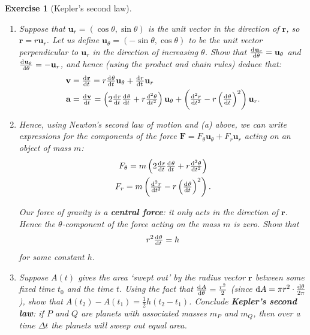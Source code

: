 \documentclass[a4paper,leqno,10pt]{article}
\theoremstyle{exercise}
\newtheorem{Exercise}{Exercise}
\newenvironment{exercise}
  {\begin{mdframed}\begin{Exercise}}
  {\end{Exercise}\end{mdframed}}
\theoremstyle{plain}
\theoremstyle{definition}
\theoremstyle{remark}
\newcommand{\df}{\textbf}
\renewcommand\vec{\mathbf}
\begin{document}
\begin{exercise}[Kepler's second law]
  \begin{enumerate}
    \item Suppose that $ \vec{u}_r = (\cos \theta, \sin \theta) $ is the unit vector in the direction of $ \vec{r} $, so $ \vec{r} = r\vec{u}_r $.
          Let us define $ \vec{u}_\theta = (-\sin\theta, \cos \theta) $ to be the unit vector perpendicular to $ \vec{u}_r $ in the direction
          of increasing $ \theta $. Show that $ \od{\vec{u}_r}{\theta} = \vec{u}_\theta $ and $ \od{\vec{u}_\theta}{\theta} = -\vec{u}_r $, and hence (using
          the product and chain rules) deduce that:
          \begin{align*}
            \vec{v} &= \od{\vec{r}}{t} = r \od{\theta}{t} \vec{u}_\theta + \od{r}{t} \vec{u}_r\\
            \vec{a} &= \od{\vec{v}}{t} = \left( 2\od{r}{t} \od{\theta}{t} + r \od[2]{\theta}{t} \right) \vec{u}_\theta
                                      + \left( \od[2]{r}{t} - r \left( \od{\theta}{t} \right)^2 \right) \vec{u}_r.
          \end{align*}
    \item Hence, using Newton's second law of motion and (a) above, we can write expressions for the components of the
          force $ \vec{F} = F_\theta \vec{u}_\theta + F_r \vec{u}_r $ acting on an object of mass $ m $:
          \begin{gather*}
            F_\theta = m\left( 2\od{r}{t} \od{\theta}{t} + r \od[2]{\theta}{t} \right)\\
            F_r = m\left( \od[2]{r}{t} - r \left( \od{\theta}{t} \right)^2 \right).
          \end{gather*}

          Our force of gravity is a \df{central force}: it only acts in the direction of $ \vec{r} $. Hence the $ \theta$-component
          of the force acting on the mass $ m $ is zero. Show that
          \begin{displaymath}
            r^2 \od{\theta}{t} = h
          \end{displaymath}
          for some constant $ h $.
    \item Suppose $ A(t) $ gives the area `swept out' by the radius vector $ \vec{r} $ between some fixed time $ t_0 $
          and the time $ t $. Using the fact that $ \od{A}{\theta} = \frac{r^2}{2} $ (since $ \dif{A} = \pi r^2 \cdot \frac{\dif{\theta}}{2\pi} $),
          show that $ A(t_2) - A(t_1) = \frac{1}{2}h(t_2 - t_1) $. Conclude \df{Kepler's second law}: if $ P $ and $ Q $ are
          planets with associated masses $ m_P $ and $ m_Q $, then over a time $ \Delta t $ the planets will sweep out equal
          area.
  \end{enumerate}
\end{exercise}
\end{document}
